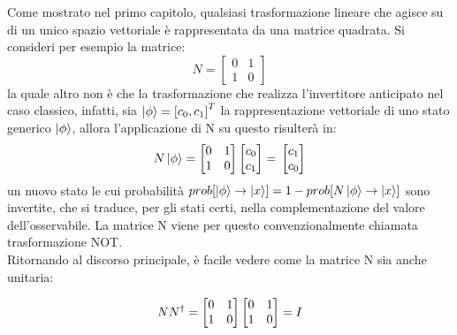 \documentclass[12pt,a4paper,openright]{report}
\begin{document}
Come mostrato nel primo capitolo, qualsiasi trasformazione lineare che agisce su di un unico spazio vettoriale è rappresentata da una matrice quadrata. Si consideri per esempio la matrice:
\[
   N = \begin{bmatrix}
        0 & 1 \\
        1 & 0
    \end{bmatrix}
\]
la quale altro non è che la trasformazione che realizza l'invertitore anticipato nel caso classico, infatti, sia $\ket{\phi} = {[c_0, c_1]}^T$ 
la rappresentazione vettoriale di uno stato generico $\ket{\phi}$, allora l'applicazione di N su questo risulterà in: 
\[
    N\ket{\phi}=
    \begin{bmatrix}
        0 & 1 \\
        1 & 0
    \end{bmatrix}
    \begin{bmatrix}
        c_0 \\ c_1
    \end{bmatrix}=\\
    \begin{bmatrix}
        c_1 \\
        c_0
    \end{bmatrix}
\]
un nuovo stato le cui probabilità $prob[\ket{\phi} \rightarrow \ket{x}] = 1 - prob[N\ket{\phi} \rightarrow \ket{x}]$ sono invertite,
che si traduce, per gli stati certi, nella complementazione del valore dell'osservabile. La matrice N viene per questo convenzionalmente chiamata trasformazione NOT.\\
Ritornando al discorso principale, è facile vedere come la matrice N sia anche unitaria:

\[
    NN^{\dag} = 
    \begin{bmatrix}
        0 & 1 \\
        1 & 0
    \end{bmatrix}
    \begin{bmatrix}
        0 & 1 \\
        1 & 0
    \end{bmatrix}=\\
    I
\]
\par
\end{document}

